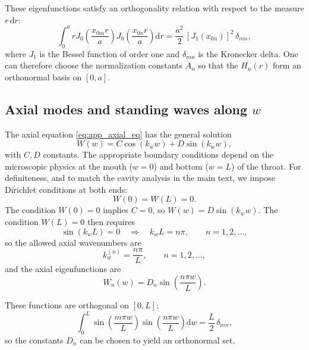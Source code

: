 \documentclass[12pt]{article}
\begin{document}
These eigenfunctions satisfy an orthogonality relation with respect to the
measure $r\,\mathrm{d}r$:
\begin{equation}
  \int_0^a r
    J_0\!\left(\frac{x_{0m} r}{a}\right)
    J_0\!\left(\frac{x_{0n} r}{a}\right)
  \mathrm{d}r
  = \frac{a^2}{2}\,[J_1(x_{0n})]^2\,\delta_{mn},
  \label{eq:app_bessel_orth}
\end{equation}
where $J_1$ is the Bessel function of order one and $\delta_{mn}$ is the
Kronecker delta.  One can therefore choose the normalization constants $A_n$
so that the $H_n(r)$ form an orthonormal basis on $[0,a]$.

\subsection{Axial modes and standing waves along \texorpdfstring{$w$}{w}}

The axial equation \eqref{eq:app_axial_eq} has the general solution
\begin{equation}
  W(w)
  = C\cos(k_w w) + D\sin(k_w w),
\end{equation}
with $C,D$ constants.  The appropriate boundary conditions depend on the
microscopic physics at the mouth ($w=0$) and bottom ($w=L$) of the throat.
For definiteness, and to match the cavity analysis in the main text, we
impose Dirichlet conditions at both ends:
\begin{equation}
  W(0) = W(L) = 0.
\end{equation}
The condition $W(0)=0$ implies $C=0$, so $W(w) = D\sin(k_w w)$.  The
condition $W(L)=0$ then requires
\begin{equation}
  \sin(k_w L) = 0
  \quad\Rightarrow\quad
  k_w L = n\pi,
  \qquad n=1,2,\dots,
\end{equation}
so the allowed axial wavenumbers are
\begin{equation}
  k_w^{(n)}
  = \frac{n\pi}{L},
  \qquad n=1,2,\dots,
\end{equation}
and the axial eigenfunctions are
\begin{equation}
  W_n(w)
  = D_n \sin\!\left(\frac{n\pi w}{L}\right).
\end{equation}

These functions are orthogonal on $[0,L]$:
\begin{equation}
  \int_0^L
    \sin\!\left(\frac{m\pi w}{L}\right)
    \sin\!\left(\frac{n\pi w}{L}\right)\mathrm{d}w
  = \frac{L}{2}\,\delta_{mn},
  \label{eq:app_sine_orth}
\end{equation}
so the constants $D_n$ can be chosen to yield an orthonormal set.
\end{document}
